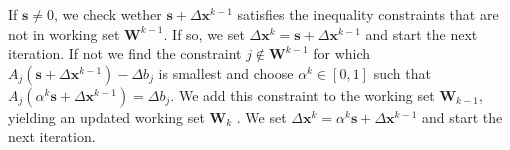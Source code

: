 If $\mathbf{s} \neq 0$, we check wether $\mathbf{s} + \Delta \mathbf{x}^{k-1}$
satisfies the inequality constraints that are not in working set
$\mathbf{W}^{k-1}$. If so, we set $\Delta \mathbf{x}^k = \mathbf{s}
+ \Delta \mathbf{x}^{k-1}$ and start the next iteration. If not we find the
constraint $j \notin \mathbf{W}^{k-1}$ for which $A_j (\mathbf{s}
+ \Delta \mathbf{x}^{k-1}) - \Delta b_j$ is smallest and choose $\alpha^k \in
[0,1]$ such that $A_j(\alpha^k \mathbf{s} + \Delta \mathbf{x}^{k-1}) = \Delta
b_j$. We add this constraint to the working set $\mathbf{W}_{k-1}$, yielding an
updated working set $\mathbf{W}_k$ . We set $\Delta \mathbf{x}^k
= \alpha^k \mathbf{s} + \Delta \mathbf{x}^{k-1}$ and start the next iteration.

